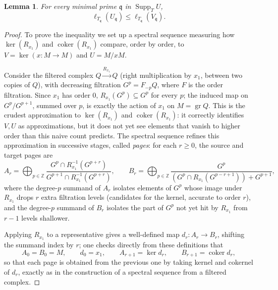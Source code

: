 \documentclass[11pt]{amsart}
\numberwithin{equation}{section}
\newtheorem{lemma}[theorem]{Lemma}
\theoremstyle{plain}
\theoremstyle{remark}
\begin{document}
\begin{lemma}\label{lem:page-inequality}
For every minimal prime $\mathfrak q$ in $\operatorname{Supp}_T U$,
\[
 \ell_{T_{\mathfrak q}}(U_{\mathfrak q})
 \le \ell_{T_{\mathfrak q}}(V_{\mathfrak q}).
\]
\end{lemma}

\begin{proof}
To prove the inequality we set up a spectral sequence measuring how $\ker(R_{x_1})$ and
$\operatorname{coker}(R_{x_1})$ compare, order by order, to $V=\ker(x:M\to M)$ and
$U=M/xM$.

Consider the filtered complex $Q\xrightarrow{R_{x_1}}Q$ (right multiplication by ${x_1}$,
between two copies of $Q$), with decreasing filtration $G^p=F_{-p}Q$, where $F$ is
the order filtration. Since ${x_1}$ has order $0$, $R_{x_1}(G^p)\subseteq G^p$ for every
$p$; the induced map on $G^p/G^{p+1}$, summed over $p$, is exactly the action of
${x_1}$ on $M=\operatorname{gr}Q$. This is the crudest approximation to $\ker(R_{x_1})$ and
$\operatorname{coker}(R_{x_1})$: it correctly identifies $V,U$ as approximations, but it
does not yet see elements that vanish to higher order than this naive count
predicts. The spectral sequence refines this approximation in successive stages,
called \emph{pages}: for each $r\ge0$, the source and target pages are
\[
 A_r=\bigoplus_{p\in\mathbb Z}\frac{G^p\cap R_{x_1}^{-1}(G^{p+r})}{G^{p+1}\cap R_{x_1}^{-1}(G^{p+r})},
 \qquad
 B_r=\bigoplus_{p\in\mathbb Z}\frac{G^p}{(G^p\cap R_{x_1}(G^{p-r+1}))+G^{p+1}},
\]
where the degree-$p$ summand of $A_r$ isolates elements of $G^p$ whose image under
$R_{x_1}$ drops $r$ extra filtration levels (candidates for the kernel, accurate to
order $r$), and the degree-$p$ summand of $B_r$ isolates the part of $G^p$ not yet
hit by $R_{x_1}$ from $r-1$ levels shallower.

Applying $R_{x_1}$ to a representative gives a well-defined map $d_r:A_r\to B_r$,
shifting the summand index by $r$; one checks directly from these definitions that
\[
 A_0=B_0=M,\qquad d_0={x_1},\qquad A_{r+1}=\ker d_r,\qquad B_{r+1}=\operatorname{coker}d_r,
\]
so that each page is obtained from the previous one by taking kernel and cokernel
of $d_r$, exactly as in the construction of a spectral sequence from a filtered
complex.


\end{proof}
\end{document}
